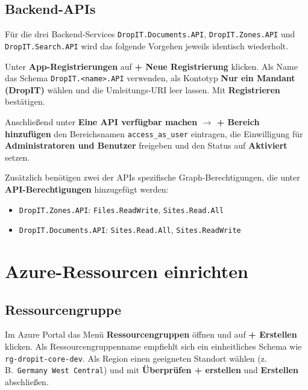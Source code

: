 \subsection{Backend-APIs}
 
Für die drei Backend-Services \texttt{DropIT.Documents.API},
\texttt{DropIT.Zones.API} und \texttt{DropIT.Search.API} wird das
folgende Vorgehen jeweils identisch wiederholt.
 
Unter \textbf{App-Registrierungen} auf \textbf{+ Neue Registrierung}
klicken. Als Name das Schema \texttt{DropIT.<name>.API} verwenden,
als Kontotyp \textbf{Nur ein Mandant (DropIT)} wählen und die
Umleitungs-URI leer lassen. Mit \textbf{Registrieren} bestätigen.
 
Anschließend unter \textbf{Eine API verfügbar machen $\to$
+ Bereich hinzufügen} den Bereichsnamen \texttt{access\_as\_user}
eintragen, die Einwilligung für \textbf{Administratoren und Benutzer}
freigeben und den Status auf \textbf{Aktiviert} setzen.
 
Zusätzlich benötigen zwei der APIs spezifische Graph-Berechtigungen,
die unter \textbf{API-Berechtigungen} hinzugefügt werden:
 
\begin{itemize}
    \item \texttt{DropIT.Zones.API}: \texttt{Files.ReadWrite}, \texttt{Sites.Read.All}
    \item \texttt{DropIT.Documents.API}: \texttt{Sites.Read.All}, \texttt{Sites.ReadWrite}
\end{itemize}
 
\section{Azure-Ressourcen einrichten}
 
\subsection{Ressourcengruppe}
 
Im Azure Portal das Menü \textbf{Ressourcengruppen} öffnen und auf
\textbf{+ Erstellen} klicken. Als Ressourcengruppenname empfiehlt sich
ein einheitliches Schema wie \texttt{rg-dropit-core-dev}. Als Region
einen geeigneten Standort wählen (z.\,B.\ \texttt{Germany West Central})
und mit \textbf{Überprüfen + erstellen} und \textbf{Erstellen} abschließen.
 
